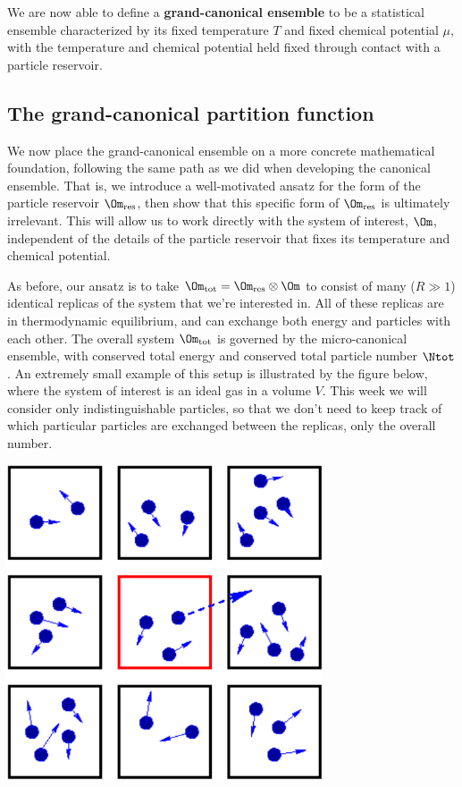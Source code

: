 \begin{shaded}
  We are now able to define a \textbf{grand-canonical ensemble} to be a statistical ensemble characterized by its fixed temperature $T$ and fixed chemical potential $\mu$, with the temperature and chemical potential held fixed through contact with a particle reservoir.
\end{shaded}



\subsection{\label{sec:Zg}The grand-canonical partition function}
We now place the grand-canonical ensemble on a more concrete mathematical foundation, following the same path as we did when developing the canonical ensemble.
That is, we introduce a well-motivated ansatz for the form of the particle reservoir $\Om_{\text{res}}$, then show that this specific form of $\Om_{\text{res}}$ is ultimately irrelevant.
This will allow us to work directly with the system of interest, $\Om$, independent of the details of the particle reservoir that fixes its temperature and chemical potential.

As before, our ansatz is to take $\Om_{\text{tot}} = \Om_{\text{res}} \otimes \Om$ to consist of many ($R \gg 1$) identical replicas of the system \Om that we're interested in.
All of these replicas are in thermodynamic equilibrium, and can exchange both energy and particles with each other.
The overall system $\Om_{\text{tot}}$ is governed by the micro-canonical ensemble, with conserved total energy \Etot and conserved total particle number $\Ntot$.
An extremely small example of this setup is illustrated by the figure below, where the system of interest is an ideal gas in a volume $V$.
This week we will consider only indistinguishable particles, so that we don't need to keep track of which particular particles are exchanged between the replicas, only the overall number.

\begin{center}
  \includegraphics[width=0.7\textwidth]{figs/unit06_reservoir.pdf}
\end{center}

